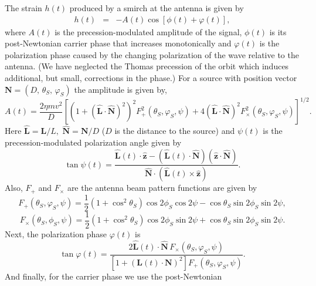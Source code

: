 The strain $h(t)$ produced by a smirch at the antenna is given by
\begin{eqnarray}
 h(t) & = & -A(t)\cos[\phi(t)+\varphi(t)],
\label{eqn:waveform}
\end{eqnarray}
where $A(t)$ is the precession-modulated amplitude of the signal,
$\phi(t)$ is its post-Newtonian carrier phase that
increases monotonically and $\varphi(t)$ is the polarization phase caused
by the changing polarization of the wave relative to the antenna. (We have
neglected the Thomas precession of the orbit which induces additional, but
small, corrections in the phase.) For a source with position vector
${\mathbf N} = (D,\, \theta_S,\, \varphi_S)$ the amplitude is given by,
\begin{equation}
 A(t) = \frac{2\eta m v^2}{D}
\left[ \left( 1 + (\hat {\mathbf L}\cdot \hat {\mathbf N})^2\right )^2 F_{+}^2(\theta_S,\varphi_S,\psi)
 + 4 \left ( \hat {\mathbf L}\cdot \hat {\mathbf N} \right )^2 F_\times^2(\theta_S,\varphi_S,\psi) \right]^{1/2}.
\label{eqn:amplitude}
\end{equation}
Here $\hat{\mathbf L} = {\mathbf L}/L,$ $\hat{\mathbf N} = {\mathbf N}/D$ ($D$ is the distance to
the source) and $\psi(t)$ is the precession-modulated polarization angle given by
\begin{equation}
\tan \psi(t) =
\frac{\hat{\mathbf L}(t)\cdot\hat{\mathbf z} - (\hat{\mathbf L}(t)\cdot\hat{\mathbf N})
(\hat{\mathbf z}\cdot\hat{\mathbf N})}
{\hat{\mathbf N}\cdot(\hat{\mathbf L}(t)\times\hat{\mathbf z})}.
\label{eqn:psi(t)}
\end{equation}
Also, $F_+$ and $F_\times$ are the antenna beam pattern functions are given by
\begin{equation}
F_+(\theta_S,\varphi_S,\psi) = \frac{1}{2}\left(1+\cos^2\theta_S\right)\cos{2\phi_S}\cos{2\psi}
- \cos\theta_S\sin{2\phi_S}\sin{2\psi},
\end{equation}
\begin{equation}
F_{\times}(\theta_S,\phi_S,\psi) =
\frac{1}{2}\left(1+\cos^2\theta_S\right)\cos{2\phi_S}\sin{2\psi}
+ \cos\theta_S\sin{2\phi_S}\sin{2\psi}.
\end{equation}
Next, the polarization phase $\varphi(t)$ is
\begin{equation}
\tan \varphi(t) =
\frac{ 2 \hat {\mathbf L}(t) \cdot \hat {\mathbf N}\, F_\times(\theta_S,\varphi_S,\psi)}
{\left [ 1 + \left ({\mathbf L}(t)\cdot {\mathbf N} \right )^2 \right ] F_{+}(\theta_S,\varphi_S,\psi)}.
\label{eqn:varphi}
\end{equation}
And finally, for the carrier phase we use the post-Newtonian
